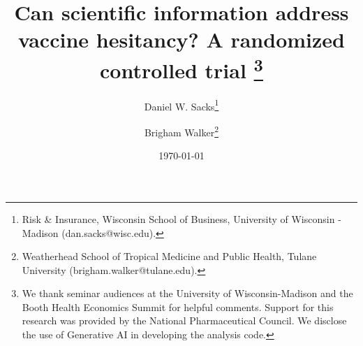 

\title{Can scientific information address vaccine hesitancy? A randomized controlled trial \thanks{We thank seminar audiences 
at the University of Wisconsin-Madison and the Booth Health Economics Summit for helpful comments. Support for this research was 
provided by the National Pharmaceutical Council. We disclose the use of Generative AI in developing the analysis code. 
}}
\author{Daniel W. Sacks\thanks{%
  Risk \& Insurance, Wisconsin School of Business, University of Wisconsin - Madison 
  (dan.sacks@wisc.edu).}
 \and
Brigham Walker\thanks{%
  Weatherhead School of Tropical Medicine and Public Health, Tulane University
  (brigham.walker@tulane.edu).} 
}
\date{\today}
